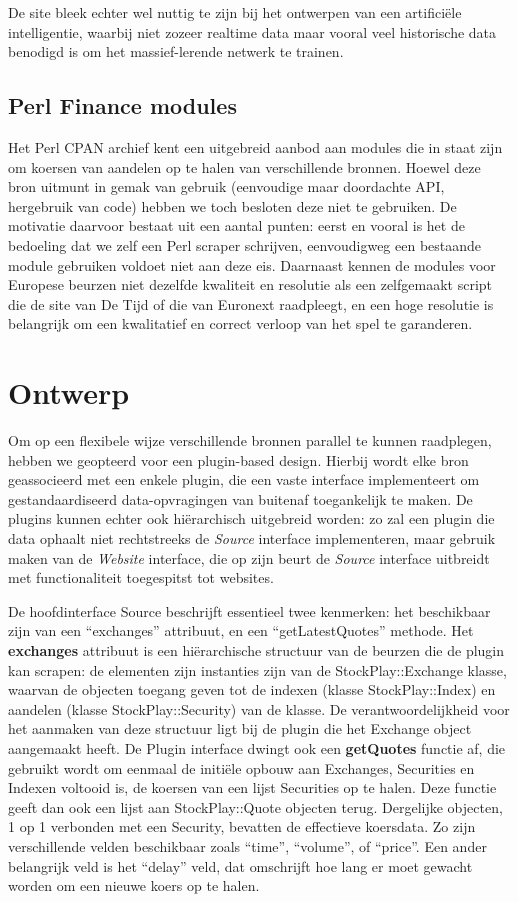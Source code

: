 De site bleek echter wel nuttig te zijn bij het ontwerpen van een artifici\"ele intelligentie, waarbij niet zozeer realtime data maar vooral veel historische data benodigd is om het massief-lerende netwerk te trainen.

\subsection{Perl Finance modules}

Het Perl CPAN archief kent een uitgebreid aanbod aan modules die in staat zijn om koersen van aandelen op te halen van verschillende bronnen. Hoewel deze bron uitmunt in gemak van gebruik (eenvoudige maar doordachte API, hergebruik van code) hebben we toch besloten deze niet te gebruiken. De motivatie daarvoor bestaat uit een aantal punten: eerst en vooral is het de bedoeling dat we zelf een Perl scraper schrijven, eenvoudigweg een bestaande module gebruiken voldoet niet aan deze eis. Daarnaast kennen de modules voor Europese beurzen niet dezelfde kwaliteit en resolutie als een zelfgemaakt script die de site van De Tijd of die van Euronext raadpleegt, en een hoge resolutie is belangrijk om een kwalitatief en correct verloop van het spel te garanderen.

\section{Ontwerp}

Om op een flexibele wijze verschillende bronnen parallel te kunnen raadplegen, hebben we geopteerd voor een plugin-based design. Hierbij wordt elke bron geassocieerd met een enkele plugin, die een vaste interface implementeert om gestandaardiseerd data-opvragingen van buitenaf toegankelijk te maken. De plugins kunnen echter ook hi\"erarchisch uitgebreid worden: zo zal een plugin die data ophaalt niet rechtstreeks de \emph{Source} interface implementeren, maar gebruik maken van de \emph{Website} interface, die op zijn beurt de \emph{Source} interface uitbreidt met functionaliteit toegespitst tot websites.

De hoofdinterface Source beschrijft essentieel twee kenmerken: het beschikbaar zijn van een ``exchanges'' attribuut, en een ``getLatestQuotes'' methode. Het \textbf{exchanges} attribuut is een hi\"erarchische structuur van de beurzen die de plugin kan scrapen: de elementen zijn instanties zijn van de StockPlay::Exchange klasse, waarvan de objecten toegang geven tot de indexen (klasse StockPlay::Index) en aandelen (klasse StockPlay::Security) van de klasse. De verantwoordelijkheid voor het aanmaken van deze structuur ligt bij de plugin die het Exchange object aangemaakt heeft.
De Plugin interface dwingt ook een \textbf{getQuotes} functie af, die gebruikt wordt om eenmaal de initi\"ele opbouw aan Exchanges, Securities en Indexen voltooid is, de koersen van een lijst Securities op te halen. Deze functie geeft dan ook een lijst aan StockPlay::Quote objecten terug. Dergelijke objecten, 1 op 1 verbonden met een Security, bevatten de effectieve koersdata. Zo zijn verschillende velden beschikbaar zoals ``time'', ``volume'', of ``price''. Een ander belangrijk veld is het ``delay'' veld, dat omschrijft hoe lang er moet gewacht worden om een nieuwe koers op te halen.

